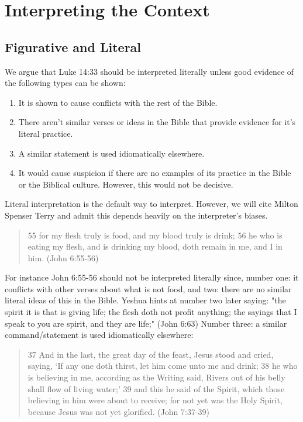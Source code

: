 \documentclass[11pt]{article}
\begin{document}
\section{Interpreting the Context}

\subsection{Figurative and Literal} \label{the figurative and literal}
We argue that Luke 14:33 should be interpreted literally unless good evidence of the following types can be shown: 
\begin{enumerate}
\item It is shown to cause conflicts with the rest of the Bible. 
\item There aren't similar verses or ideas in the Bible that provide evidence for it's literal practice. 
\item A similar statement is used idiomatically elsewhere. 
\item It would cause suspicion if there are no examples of its practice in the Bible or the Biblical culture. However, this would not be decisive.
 \end{enumerate}
Literal interpretation is the default way to interpret. However, we will cite Milton Spenser Terry and admit this depends heavily on the interpreter's biases.\cite{mt}
\begin{quote}
55 for my flesh truly is food, and my blood truly is drink; 56 he who is eating my flesh, and is drinking my blood, doth remain in me, and I in him. (John 6:55-56) \end{quote}
For instance John 6:55-56 should not be interpreted literally since, number one: it conflicts with other verses about what is not food, and two: there are no similar literal ideas of this in the Bible. Yeshua hints at number two later saying: "the spirit it is that is giving life; the flesh doth not profit anything; the sayings that I speak to you are spirit, and they are life;" (John 6:63) Number three: a similar command/statement is used idiomatically elsewhere:
\begin{quote}
37 And in the last, the great day of the feast, Jesus stood and cried, saying, `If any one doth thirst, let him come unto me and drink;
38 he who is believing in me, according as the Writing said, Rivers out of his belly shall flow of living water;'
39 and this he said of the Spirit, which those believing in him were about to receive; for not yet was the Holy Spirit, because Jesus was not yet glorified. (John 7:37-39)
\end{quote}
\end{document}

